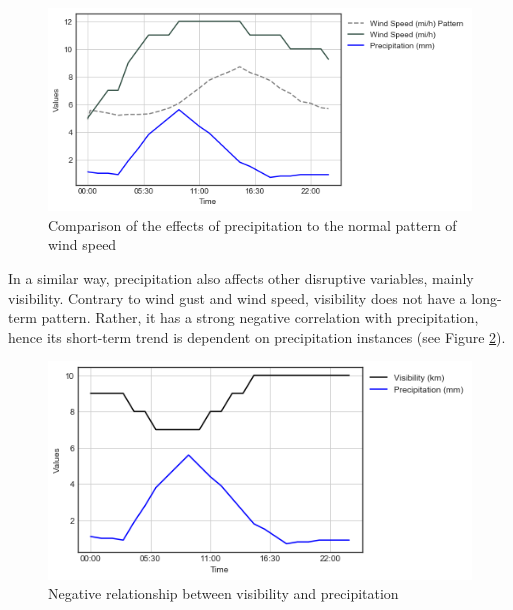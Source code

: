 \begin{figure}
  \includegraphics[width=\linewidth]{figures/figure_precip_windspeed.png}
  \caption{Comparison of the effects of precipitation to the normal pattern of wind speed}
  \label{figure_precip_windspeed}
\end{figure}



In a similar way, precipitation also affects other disruptive variables, mainly visibility. Contrary to wind gust and wind speed, visibility does not have a long-term pattern. Rather, it has a strong negative correlation with precipitation, hence its short-term trend is dependent on precipitation instances (see Figure \ref{figure_precip_visibility}).

\begin{figure}
  \includegraphics[width=\linewidth]{figures/figure_precip_visibility.png}
  \caption{Negative relationship between visibility and precipitation}
  \label{figure_precip_visibility}
\end{figure}











